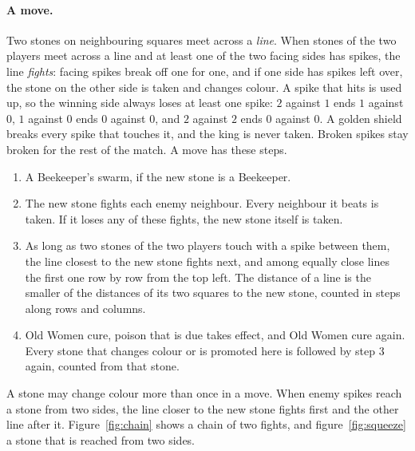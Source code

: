 \documentclass[11pt,a4paper]{article}
\begin{document}
\paragraph{A move.} Two stones on neighbouring squares meet across a \emph{line}. When stones of the two players meet across a line and at least one of the two facing sides has spikes, the line \emph{fights}: facing spikes break off one for one, and if one side has spikes left over, the stone on the other side is taken and changes colour. A spike that hits is used up, so the winning side always loses at least one spike: $2$ against $1$ ends $1$ against $0$, $1$ against $0$ ends $0$ against $0$, and $2$ against $2$ ends $0$ against $0$. A golden shield breaks every spike that touches it, and the king is never taken. Broken spikes stay broken for the rest of the match. A move has these steps.
\begin{enumerate}
  \item A Beekeeper's swarm, if the new stone is a Beekeeper.
  \item The new stone fights each enemy neighbour. Every neighbour it beats is taken. If it loses any of these fights, the new stone itself is taken.
  \item As long as two stones of the two players touch with a spike between them, the line closest to the new stone fights next, and among equally close lines the first one row by row from the top left. The distance of a line is the smaller of the distances of its two squares to the new stone, counted in steps along rows and columns.
  \item Old Women cure, poison that is due takes effect, and Old Women cure again. Every stone that changes colour or is promoted here is followed by step 3 again, counted from that stone.
\end{enumerate}
A stone may change colour more than once in a move. When enemy spikes reach a stone from two sides, the line closer to the new stone fights first and the other line after it. Figure~\ref{fig:chain} shows a chain of two fights, and figure~\ref{fig:squeeze} a stone that is reached from two sides.
\end{document}

